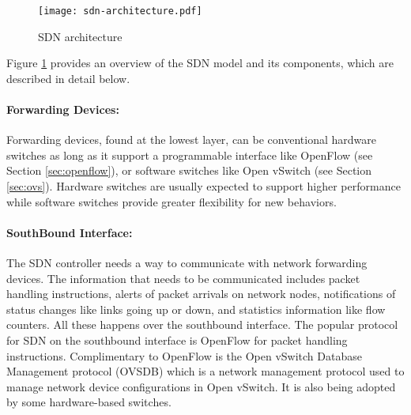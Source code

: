 \begin{figure}[tb]
\begin{center}
	\resizebox{\textwidth}{!}
	{\texttt{[image: sdn-architecture.pdf]}}
	\caption{SDN architecture \cite{6994333} \cite{sdn-def}}
	\label{fig:sdnarch}
\end{center}
\end{figure}


Figure \ref{fig:sdnarch} provides an overview of the SDN model and its components, which are described in detail below.

\paragraph{Forwarding Devices:}
Forwarding devices, found at the lowest layer, can be conventional hardware switches as long as it support a programmable interface like OpenFlow (see Section \ref{sec:openflow}), or software switches like Open vSwitch (see Section \ref{sec:ovs}). Hardware switches are usually expected to support higher performance while software switches provide greater flexibility for new behaviors.

\paragraph{SouthBound Interface:}
The SDN controller needs a way to communicate with network forwarding devices. The information that needs to be communicated includes packet handling instructions, alerts of packet arrivals on network nodes, notifications of status changes like links going up or down, and statistics information like flow counters. All these happens over the southbound interface. The popular protocol for SDN on the southbound interface is OpenFlow for packet handling instructions. Complimentary to OpenFlow is the Open vSwitch Database Management protocol (OVSDB) \cite{ovsdbproto} which is a network management protocol used to manage network device configurations in Open vSwitch. It is also being adopted by some hardware-based switches.

